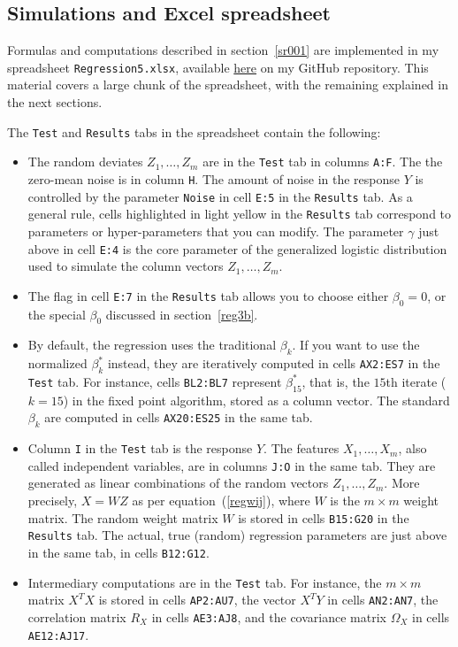 \documentclass[oneside,10pt]{book}
\begin{document}
\subsection{Simulations and Excel spreadsheet}\label{rbbb}

Formulas and computations described in section~\ref{sr001} are implemented in my spreadsheet \texttt{Regression5.xlsx}, available \href{https://github.com/VincentGranville/Machine-Learning/blob/main/Spreadsheets/README.md}{here} on my GitHub repository. This material covers a large chunk of the spreadsheet, with the remaining explained in the next sections.

\noindent The \texttt{Test} and \texttt{Results} tabs in the spreadsheet contain the following:
\begin{itemize}
\item The random deviates $Z_1,\dots,Z_m$ are in the \texttt{Test} tab in columns \texttt{A:F}. The the zero-mean noise is in column \texttt{H}. The amount of noise in the response $Y$ is controlled by the parameter \texttt{Noise} in cell \texttt{E:5} in the \texttt{Results} tab. As a general rule, cells highlighted in light yellow
in the \texttt{Results} tab correspond to parameters or hyper-parameters that you can modify. The parameter $\gamma$ just above in cell \texttt{E:4} is the core parameter of the generalized logistic distribution used to simulate the column vectors $Z_1,\dots,Z_m$.
\item The flag in cell \texttt{E:7} in the \texttt{Results} tab allows you to choose either $\beta_0=0$, or the special $\beta_0$ discussed in section~\ref{reg3b}.
\item  By default, the regression uses the traditional $\beta_k$. If you want to use the normalized $\beta^*_k$ instead, they are iteratively computed in cells \texttt{AX2:ES7} in the
\texttt{Test} tab. For instance, cells \texttt{BL2:BL7} represent $\beta_{15}^*$, that is, the $15$th iterate ($k=15$) in the fixed point algorithm, stored as a column vector. The standard $\beta_k$ are computed in cells \texttt{AX20:ES25} in the same tab.
\item Column \texttt{I} in the \texttt{Test} tab is the response $Y$. The features $X_1,\dots,X_m$, also called independent variables, are in columns \texttt{J:O} in the same tab. They are generated as linear combinations of the random vectors $Z_1,\dots,Z_m$. More precisely, $X=WZ$ as per equation~(\ref{regwij}), where
$W$ is the $m\times m$ weight matrix. The random weight matrix $W$ is stored in cells \texttt{B15:G20} in the \texttt{Results} tab. The actual, true (random) regression
parameters are just above in the same tab, in cells \texttt{B12:G12}.
\item Intermediary computations are in the \texttt{Test} tab. For instance, the $m\times m$ matrix $X^TX$ is stored in cells \texttt{AP2:AU7},
the vector $X^TY$ in cells  \texttt{AN2:AN7}, the correlation matrix $R_X$ in cells  \texttt{AE3:AJ8}, and the covariance matrix $\Omega_X$ in cells  \texttt{AE12:AJ17}.
\end{itemize}
\end{document}

